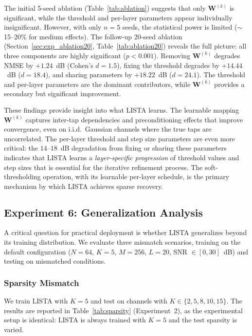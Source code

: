 \documentclass[a4paper,fleqn]{cas-sc}
\begin{document}
The initial 5-seed ablation (Table~\ref{tab:ablation}) suggests that only $\mathbf{W}^{(k)}$ is significant, while the threshold and per-layer parameters appear individually insignificant. However, with only $n=5$ seeds, the statistical power is limited ($\sim$15--20\% for medium effects). The follow-up 20-seed ablation (Section~\ref{sec:exp_ablation20}, Table~\ref{tab:ablation20}) reveals the full picture: all three components are highly significant ($p < 0.001$). Removing $\mathbf{W}^{(k)}$ degrades NMSE by $+1.24$~dB (Cohen's $d = 1.5$), fixing the threshold degrades by $+14.44$~dB ($d = 18.4$), and sharing parameters by $+18.22$~dB ($d = 24.1$). The threshold and per-layer parameters are the dominant contributors, while $\mathbf{W}^{(k)}$ provides a secondary but significant improvement.

These findings provide insight into what LISTA learns. The learnable mapping $\mathbf{W}^{(k)}$ captures inter-tap dependencies and preconditioning effects that improve convergence, even on i.i.d.~Gaussian channels where the true taps are uncorrelated. The per-layer threshold and step size parameters are even more critical: the $14$--$18$~dB degradation from fixing or sharing these parameters indicates that LISTA learns a \emph{layer-specific progression} of threshold values and step sizes that is essential for the iterative refinement process. The soft-thresholding operation, with its learnable per-layer schedule, is the primary mechanism by which LISTA achieves sparse recovery.

\subsection{Experiment 6: Generalization Analysis}\label{sec:exp_generalization}

A critical question for practical deployment is whether LISTA generalizes beyond its training distribution. We evaluate three mismatch scenarios, training on the default configuration ($N=64$, $K=5$, $M=256$, $L=20$, SNR $\in [0, 30]$~dB) and testing on mismatched conditions.

\subsubsection{Sparsity Mismatch}

We train LISTA with $K=5$ and test on channels with $K \in \{2, 5, 8, 10, 15\}$. The results are reported in Table~\ref{tab:sparsity} (Experiment~2), as the experimental setup is identical: LISTA is always trained with $K=5$ and the test sparsity is varied.
\end{document}
